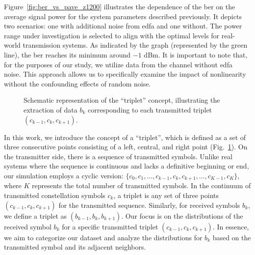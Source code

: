 Figure~\ref{fig:ber_vs_pave_z1200} illustrates the dependence of the \gls{ber} on the average signal power for the system parameters described previously. It depicts two scenarios: one with additional noise from \gls{edfa} and one without. The power range under investigation is selected to align with the optimal levels for real-world transmission systems. As indicated by the graph (represented by the green line), the \gls{ber} reaches its minimum around \(-1\) dBm. It is important to note that, for the purposes of our study, we utilize data from the channel without \gls{edfa} noise. This approach allows us to specifically examine the impact of nonlinearity without the confounding effects of random noise.


\begin{figure}[h]
    \caption{Schematic representation of the ``triplet'' concept, illustrating the extraction of data \( b_k \) corresponding to each transmitted triplet \( (c_{k-1}, c_k, c_{k+1}) \).
}
    \label{fig:triplet}
\end{figure}

In this work, we introduce the concept of a ``triplet'', which is defined as a set of three consecutive points consisting of a left, central, and right point (Fig.~\ref{fig:triplet}). On the transmitter side, there is a sequence of transmitted symbols. Unlike real systems where the sequence is continuous and lacks a definitive beginning or end, our simulation employs a cyclic version: \(\{c_0, c_1, \ldots, c_{k-1}, c_k, c_{k+1}, \ldots, c_{K-1}, c_{K}\}\), where \(K\) represents the total number of transmitted symbols. In the continuum of transmitted constellation symbols \(c_k\), a triplet is any set of three points \((c_{k-1}, c_k, c_{k+1})\) for the transmitted sequence. Similarly, for received symbols \(b_k\), we define a triplet as \((b_{k-1}, b_k, b_{k+1})\). Our focus is on the distributions of the received symbol \(b_k\) for a specific transmitted triplet \((c_{k-1}, c_k, c_{k+1})\). In essence, we aim to categorize our dataset and analyze the distributions for \(b_k\) based on the transmitted symbol and its adjacent neighbors.

